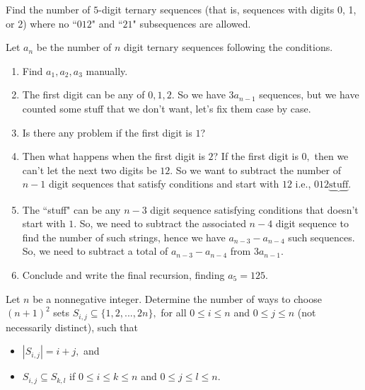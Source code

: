 \documentclass[mast]{lucky}
\begin{document}
\begin{exam}
Find the number of $5$-digit ternary sequences (that is, sequences with digits 0, 1, or 2) where no ``$012$" and ``$21$" subsequences are allowed.
\end{exam}

\begin{walk}
Let $a_n$ be the number of $n$ digit ternary sequences following the conditions.
\begin{enumerate}
\item Find $a_1, a_2, a_3$ manually.
\item The first digit can be any of $0, 1, 2.$ So we have $3a_{n-1}$ sequences, but we have counted some stuff that we don't want, let's fix them case by case.
\item Is there any problem if the first digit is $1$? 
\item Then what happens when the first digit is $2$?
If the first digit is $0,$ then we can't let the next two digits be $12$. So we want to subtract the number of $n-1$ digit sequences that satisfy conditions and start with $12$ i.e., $012\underbrace{\text{stuff}}.$
\item The ``stuff" can be any $n-3$ digit sequence satisfying conditions that doesn't start with $1$. So, we need to subtract the associated $n-4$ digit sequence to find the number of such strings, hence we have $a_{n-3} - a_{n-4}$ such sequences.
So, we need to subtract a total of $a_{n-3} - a_{n-4}$ from $3a_{n-1}.$  
\item Conclude and write the final recursion, finding $a_5 = 125.$
\end{enumerate}
\end{walk}








%
%


\begin{exam}
[USAJMO 2019/5] Let $n$ be a nonnegative integer. Determine the number of ways to choose $(n+1)^2$ sets $S_{i,j} \subseteq \{1, 2, . . . , 2n\},$
for all $0 \leq i \leq n$ and $0 \leq j \leq n$ (not necessarily distinct), such that
\begin{itemize}
\item $|S_{i,j}| = i + j,$ and
\item $S_{i,j} \subseteq S_{k,l}$ if $0 \leq i \leq k \leq n$ and $0 \leq j \leq l \leq n.$
\end{itemize}
\end{exam}
\end{document}
